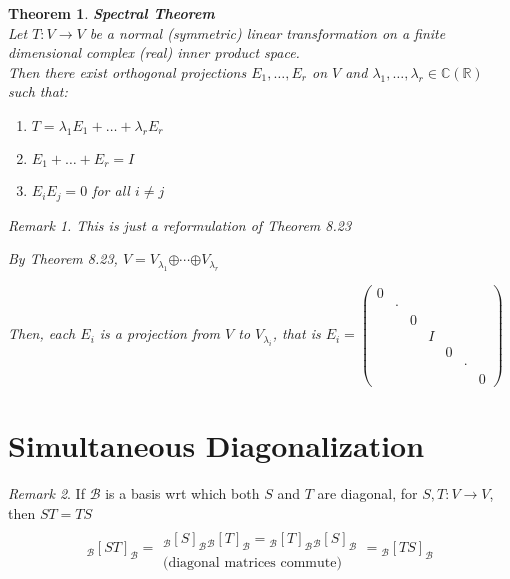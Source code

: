 \documentclass[11pt, a4paper]{report}
\makeatletter
\numberwithin{equation}{section}
\newcommand{\opl}{\boldsymbol{\oplus}}
\newcommand{\R}{\mathbb{R}}
\newcommand{\B}{\mathcal{B}}
\newcommand{\C}{\mathbb{C}}
\newcommand{\smp}[1]{\left(\begin{smallmatrix}#1\end{smallmatrix}\right)}
\newcommand{\mx}[1]{\begin{matrix}#1\end{matrix}}
\numberwithin{equation}{subsection}
\theoremstyle{plain}
\newtheorem{thm}{Theorem}[chapter] %
\theoremstyle{definition}
\theoremstyle{remark}
\newtheorem*{rem}{Remark}
\newtheorem*{prf}{Proof}
\renewenvironment{prf}[1][\proofname]{\par
  \vspace{-\topsep}%
  \normalfont
  \topsep0pt \partopsep0pt %
  \trivlist
  \item[\hskip\labelsep
        \itshape
    #1\@addpunct{.}]\ignorespaces
}{%
  \popQED\endtrivlist\@endpefalse
  \addvspace{6pt plus 6pt} %
}
\newcommand{\pr}[1]{\begin{adjustwidth}{1cm}{} \begin{prf} #1 \end{prf} \end{adjustwidth}}
\makeatother
\begin{document}
\begin{thm}\textnormal{\textbf{Spectral Theorem}}\\
Let $T: V \to V$ be a normal (symmetric) linear transformation on a finite dimensional complex (real) inner product space.\\ Then there exist orthogonal projections $E_1, \ldots, E_r$ on $V$ and $\lambda_1, \ldots, \lambda_r \in \C (\R)$ such that:
\begin{adjustwidth}{1cm}{}
\begin{enumerate}[(1) ]
\item $T = \lambda_1 E_1 + \ldots + \lambda_r E_r$
\item $E_1 + \ldots + E_r = I$
\item $E_i E_j = 0$ for all $i \neq j$
\end{enumerate}
\end{adjustwidth}

\begin{rem} This is just a reformulation of Theorem 8.23 \end{rem}

\pr{
By Theorem 8.23, $V = V_{\lambda_1} \opl \cdots \opl V_{\lambda_r}$

Then, each $E_i$ is a projection from $V$ to $V_{\lambda_i}$, that is $E_i = \smp{0 \\ & \cdot \\ &&0 \\ &&&I\\ &&&&0 \\ &&&&&\cdot \\ &&&&&&0}$
}
\end{thm}

\newpage

\section{Simultaneous Diagonalization}

\begin{rem}
If $\B$ is a basis wrt which both $S$ and $T$ are diagonal, for $S,T : V \to V$, then $ST = TS$
$${_\B[ST]_\B} = \mx{\\{_\B[S]_\B}{_\B[T]_\B} = {_\B[T]_\B}{_\B[S]_\B}\\ \text{(diagonal matrices commute)}}= {_\B[TS]_\B}$$
\end{rem}
\end{document}
